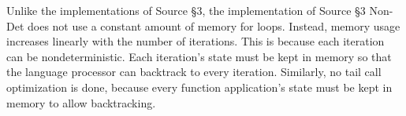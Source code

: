 Unlike the implementations of Source \S 3,  the implementation of Source \S 3 Non-Det does not use a constant amount of memory for loops. Instead, memory usage increases linearly with the number of iterations. This is because each iteration can be nondeterministic. Each iteration's state must be kept in memory so that the language processor can backtrack to every iteration. Similarly, no tail call optimization is done, because every function application's state must be kept in memory to allow backtracking.




\newpage



\newpage
































\newpage



\newpage



\newpage



    
